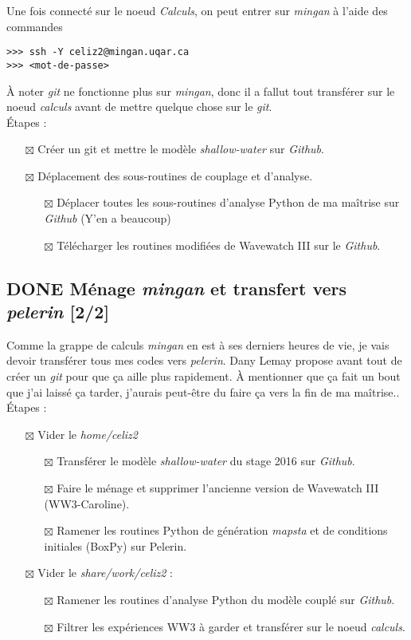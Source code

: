 \documentclass{article}
\numberwithin{equation}{section}
\begin{document}
Une fois connecté sur le noeud \emph{Calculs}, on peut entrer sur \emph{mingan} à l'aide des commandes
\begin{verbatim}
>>> ssh -Y celiz2@mingan.uqar.ca
>>> <mot-de-passe>
\end{verbatim}
À noter \emph{git} ne fonctionne plus sur \emph{mingan}, donc il a fallut tout transférer sur le noeud \emph{calculs} avant de mettre quelque chose sur le \emph{git}.\\[0pt]

Étapes : 
\begin{itemize}
\item[{$\boxtimes$}] Créer un git et mettre le modèle \emph{shallow-water} sur \emph{Github}.
\item[{$\boxtimes$}] Déplacement des sous-routines de couplage et d'analyse.
\begin{itemize}
\item[{$\boxtimes$}] Déplacer toutes les sous-routines d'analyse Python de ma maîtrise sur \emph{Github} (Y'en a beaucoup)
\item[{$\boxtimes$}] Télécharger les routines modifiées de Wavewatch III sur le \emph{Github}.
\end{itemize}
\end{itemize}

\subsection{{\bfseries\sffamily DONE} Ménage \emph{mingan} et transfert vers \emph{pelerin} [2/2]}
\label{sec:org1330f7a}
Comme la grappe de calculs \emph{mingan} en est à ses derniers heures de vie, je vais devoir transférer tous mes codes vers \emph{pelerin}.
Dany Lemay propose avant tout de créer un \emph{git} pour que ça aille plus rapidement.
À mentionner que ça fait un bout que j'ai laissé ça tarder, j'aurais peut-être du faire ça vers la fin de ma maîtrise..\\[0pt]

Étapes : 
\begin{itemize}
\item[{$\boxtimes$}] Vider le \emph{home/celiz2}
\begin{itemize}
\item[{$\boxtimes$}] Transférer le modèle \emph{shallow-water} du stage 2016 sur \emph{Github}.
\item[{$\boxtimes$}] Faire le ménage et supprimer l'ancienne version de Wavewatch III (WW3-Caroline).
\item[{$\boxtimes$}] Ramener les routines Python de génération \emph{mapsta} et de conditions initiales (BoxPy) sur Pelerin.
\end{itemize}
\item[{$\boxtimes$}] Vider le \emph{share/work/celiz2} :
\begin{itemize}
\item[{$\boxtimes$}] Ramener les routines d'analyse Python du modèle couplé sur \emph{Github}.
\item[{$\boxtimes$}] Filtrer les expériences WW3 à garder et transférer sur le noeud \emph{calculs}.
\end{itemize}
\end{itemize}
\end{document}
